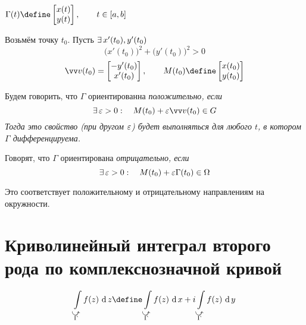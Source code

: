 \begin{noproof}
\end{noproof}

$ \Gamma(t) \define
\begin{bmatrix}
	x(t) \\
	y(t)
\end{bmatrix}, \qquad t \in [a, b] $

Возьмём точку $ t_0 $. Пусть $ \exists\, x'(t_0), y'(t_0) $
$$ \bigg( x'(t_0) \bigg)^2 + \bigg( y'(t_0) \bigg)^2 > 0 $$
$$ \vv v(t_0) =
\begin{bmatrix}
	-y'(t_0) \\
	x'(t_0)
\end{bmatrix}, \qquad M(t_0) \define
\begin{bmatrix}
	x(t_0) \\
	y(t_0)
\end{bmatrix} $$

\begin{definition}
	Будем говорить, что $ \Gamma $ ориентированна \it{положительно}, если
	$$ \exist \veps > 0 : \quad M(t_0) + \veps \vv v(t_0) \in G $$
	Тогда это свойство (при другом $ \varepsilon $) будет выполняться для любого $ t $, в котором $ \Gamma $ дифференцируема.
\end{definition}

\begin{definition}
	Говорят, что $ \Gamma $ ориентирована \it{отрицательно}, если
	$$ \exists\, \varepsilon > 0 : \quad M(t_0) + \varepsilon \Gamma(t_0) \in \Omega $$
\end{definition}

\begin{remark}
	Это соответствует положительному и отрицательному направлениям на окружности.
\end{remark}

\section{Криволинейный интеграл второго рода по комплекснозначной кривой}

\begin{definition}
	$$ \cint[z]{\curvedir\Gamma}{f(z)} \define \cint[x]{\curvedir\Gamma}{f(z)} + i \cint[y]{\curvedir\Gamma}{f(z)} $$
\end{definition}

